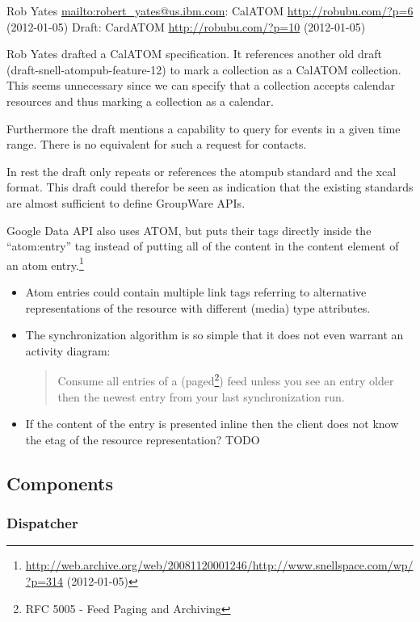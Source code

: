 \documentclass[12pt,a4paper]{scrartcl}		%
\newcommand{\citeurl}[2]{\url{#1} (#2)}
\begin{document}
Rob Yates \url{mailto:robert_yates@us.ibm.com}:
CalATOM \citeurl{http://robubu.com/?p=6}{2012-01-05} Draft:
CardATOM \citeurl{http://robubu.com/?p=10}{2012-01-05}

Rob Yates drafted a CalATOM
specification.\cite{draft-yates-atompub-calatom-00.txt} It references another
old draft (draft-snell-atompub-feature-12) to mark a collection as a CalATOM
collection. This seems unnecessary since we can specify that a collection
accepts calendar resources and thus marking a collection as a calendar.

Furthermore the draft mentions a capability to query for events in a given time
range. There is no equivalent for such a request for contacts.

In rest the draft only repeats or references the atompub standard and the xcal
format. This draft could therefor be seen as indication that the existing
standards are almost sufficient to define GroupWare APIs.

Google Data API also uses ATOM, but puts their tags directly inside the ``atom:entry'' tag 
instead of putting all of the content in the content element of an atom
entry.\footnote{\citeurl{http://web.archive.org/web/20081120001246/http://www.snellspace.com/wp/?p=314}{2012-01-05}}

\begin{itemize}
\item Atom entries could contain multiple link tags referring to alternative
  representations of the resource with different (media) type attributes.
\item The synchronization algorithm is so simple that it does not even warrant an activity diagram:
  \begin{quote}
    Consume all entries of a (paged\footnote{RFC 5005 - Feed Paging and
      Archiving}) feed unless you see an entry older then the newest entry from
    your last synchronization run.
  \end{quote}
\item If the content of the entry is presented inline then the client does not
  know the etag of the resource representation? TODO
\end{itemize}


\subsection{Components}

\subsubsection{Dispatcher}
\end{document}

